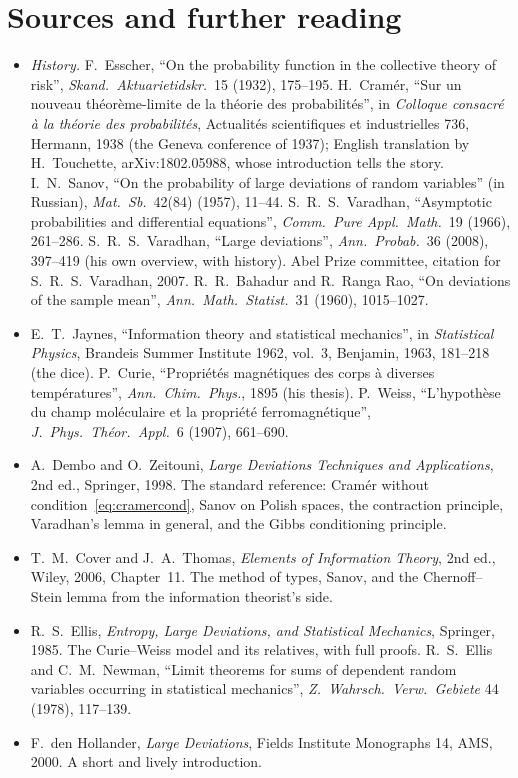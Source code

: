 \section*{Sources and further reading}

\begin{itemize}
\item \emph{History.} F.~Esscher, ``On the probability function in the collective theory of risk'', \emph{Skand.\ Aktuarietidskr.}\ 15 (1932), 175--195. H.~Cram\'er, ``Sur un nouveau
th\'eor\`eme-limite de la th\'eorie des probabilit\'es'', in \emph{Colloque consacr\'e \`a la th\'eorie des probabilit\'es}, Actualit\'es scientifiques et industrielles 736, Hermann, 1938
(the Geneva conference of 1937); English translation by H.~Touchette, arXiv:1802.05988, whose introduction tells the story. I.~N.~Sanov, ``On the probability of large
deviations of random variables'' (in Russian), \emph{Mat.\ Sb.}\ 42(84) (1957), 11--44. S.~R.~S.~Varadhan, ``Asymptotic probabilities and differential equations'', \emph{Comm.\ Pure
Appl.\ Math.}\ 19 (1966), 261--286. S.~R.~S.~Varadhan, ``Large deviations'', \emph{Ann.\ Probab.}\ 36 (2008), 397--419 (his own overview, with history). Abel Prize committee, citation for
S.~R.~S.~Varadhan, 2007. R.~R.~Bahadur and R.~Ranga Rao, ``On deviations of the sample mean'', \emph{Ann.\ Math.\ Statist.}\ 31 (1960), 1015--1027.
\item E.~T.~Jaynes, ``Information theory and statistical mechanics'', in \emph{Statistical Physics}, Brandeis Summer Institute 1962, vol.~3, Benjamin, 1963, 181--218 (the dice).
P.~Curie, ``Propri\'et\'es magn\'etiques des corps \`a diverses temp\'eratures'', \emph{Ann.\ Chim.\ Phys.}, 1895 (his thesis). P.~Weiss, ``L'hypoth\`ese du champ mol\'eculaire et la propri\'et\'e
ferromagn\'etique'', \emph{J.\ Phys.\ Th\'eor.\ Appl.}\ 6 (1907), 661--690.
\item A.~Dembo and O.~Zeitouni, \emph{Large Deviations Techniques and Applications}, 2nd ed., Springer, 1998. The standard reference: Cram\'er without condition~\eqref{eq:cramercond},
Sanov on Polish spaces, the contraction principle, Varadhan's lemma in general, and the Gibbs conditioning principle.
\item T.~M.~Cover and J.~A.~Thomas, \emph{Elements of Information Theory}, 2nd ed., Wiley, 2006, Chapter~11. The method of types, Sanov, and the Chernoff--Stein lemma
from the information theorist's side.
\item R.~S.~Ellis, \emph{Entropy, Large Deviations, and Statistical Mechanics}, Springer, 1985. The Curie--Weiss model and its relatives, with full proofs. R.~S.~Ellis and
C.~M.~Newman, ``Limit theorems for sums of dependent random variables occurring in statistical mechanics'', \emph{Z.\ Wahrsch.\ Verw.\ Gebiete} 44 (1978), 117--139.
\item F.~den Hollander, \emph{Large Deviations}, Fields Institute Monographs 14, AMS, 2000. A short and lively introduction.
\end{itemize}
